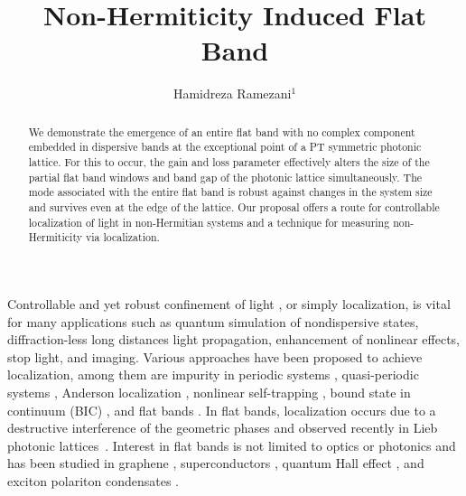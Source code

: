 \documentclass[aps,prl,twocolumn,showpacs,groupedaddress,amsmath,amssymb]{revtex4}
\begin{document}
\title{Non-Hermiticity Induced Flat Band}
\author{ Hamidreza Ramezani$^{1}$} 

\begin{abstract}
We demonstrate the emergence of an entire flat band with no complex component embedded in dispersive bands at the exceptional point of a PT symmetric photonic lattice. For this to occur, the gain and loss parameter effectively alters the size of the partial flat band windows and band gap of the photonic lattice simultaneously. The mode associated with the entire flat band is robust against changes in the system size and survives even at the edge of the lattice. Our proposal offers a route for controllable localization of light in non-Hermitian systems and a technique for measuring non-Hermiticity via localization.%
\end{abstract}



\maketitle
Controllable and yet robust confinement of light , or simply localization, is vital for many applications such as quantum simulation of nondispersive states, diffraction-less long distances light propagation, enhancement of nonlinear effects, stop light, and imaging. Various approaches have been proposed to achieve localization, among them are impurity in periodic systems \cite{1, 2, 3}, quasi-periodic systems \cite{t1,t2,t3}, Anderson localization \cite{4}, nonlinear self-trapping \cite{5, t4}, bound state in continuum (BIC) \cite{6,7}, and flat bands \cite{8,9}. In flat bands, localization occurs due to a destructive interference of the geometric phases and observed recently in Lieb photonic lattices \cite{8,9}. Interest in flat bands is not limited to optics \cite{10,11} or photonics \cite{8,9,12,13} and has been studied in graphene \cite{14}, superconductors \cite{15,16}, quantum Hall effect \cite{17,18,19,20}, and exciton polariton condensates \cite{21,22,23}.
\end{document}
